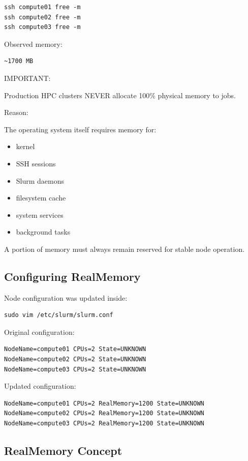 \documentclass[11pt]{article}
\begin{document}
\begin{verbatim}
ssh compute01 free -m
ssh compute02 free -m
ssh compute03 free -m
\end{verbatim}

Observed memory:

\begin{verbatim}
~1700 MB
\end{verbatim}

IMPORTANT:

Production HPC clusters NEVER allocate 100\% physical memory to jobs.

Reason:

The operating system itself requires memory for:

\begin{itemize}
\item kernel
\item SSH sessions
\item Slurm daemons
\item filesystem cache
\item system services
\item background tasks
\end{itemize}

A portion of memory must always remain reserved for stable node
operation.
\subsection{Configuring RealMemory}
\label{sec:orgf22b350}

Node configuration was updated inside:

\begin{verbatim}
sudo vim /etc/slurm/slurm.conf
\end{verbatim}

Original configuration:

\begin{verbatim}
NodeName=compute01 CPUs=2 State=UNKNOWN
NodeName=compute02 CPUs=2 State=UNKNOWN
NodeName=compute03 CPUs=2 State=UNKNOWN
\end{verbatim}

Updated configuration:

\begin{verbatim}
NodeName=compute01 CPUs=2 RealMemory=1200 State=UNKNOWN
NodeName=compute02 CPUs=2 RealMemory=1200 State=UNKNOWN
NodeName=compute03 CPUs=2 RealMemory=1200 State=UNKNOWN
\end{verbatim}
\subsection{RealMemory Concept}
\label{sec:orge37732e}
\end{document}
